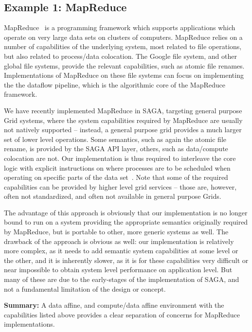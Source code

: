 \documentclass{article}
\newcommand{\B}[1]{\textbf{#1}}
\newcommand{\up}{\vspace*{-1em}}
\begin{document}
 \up
 \subsection{Example 1: MapReduce}

  MapReduce~\cite{mapreduce-paper} is a programming framework which
  supports applications which operate on very large data sets on
  clusters of computers.  MapReduce relies on a number of capabilities
  of the underlying system, most related to file operations, but also
  related to process/data colocation.  The Google file system, and
  other global file systems, provide the relevant capabilities, such
  as atomic file renames.  Implementations of MapReduce on these file
  systems can focus on implementing the the dataflow pipeline, which
  is the algorithmic core of the MapReduce framework.

  We have recently implemented MapReduce in SAGA, targeting general
  purpose Grid systems, where the system capabilities required by
  MapReduce are usually not natively supported -- instead, a general
  purpose grid provides a much larger set of lower level operations.
  Some semantics, such as again the atomic file rename, is provided by
  the SAGA API layer, others, such as data/compute colocation are not.
  Our implementation is thus required to interleave the core logic
  with explicit instructions on where processes are to be scheduled
  when operating on specific parts of the data set~\cite{gsoc-saga}.
  Note that some of the required capabilities can be provided by
  higher level grid services -- those are, however, often not
  standardized, and often not available in general purpose Grids.

  The advantage of this approach is obviously that our implementation
  is no longer bound to run on a system providing the appropriate
  semantics originally required by MapReduce, but is portable to
  other, more generic systems as well.  The drawback of the approach
  is obvious as well: our implementation is relatively more complex,
  as it needs to add semantic system capabilities at some level or the
  other, and it is inherently slower, as it is for these capabilities
  very difficult or near impossible to obtain system level performance
  on application level.  But many of these are due to the early-stages
  of the implementation of SAGA, and not a fundamental limitation of
  the design or concept.

  \B{Summary:} A data affine, and compute/data affine environment with
  the capabilities listed above provides a clear separation of
  concerns for MapReduce implementations.
\end{document}
